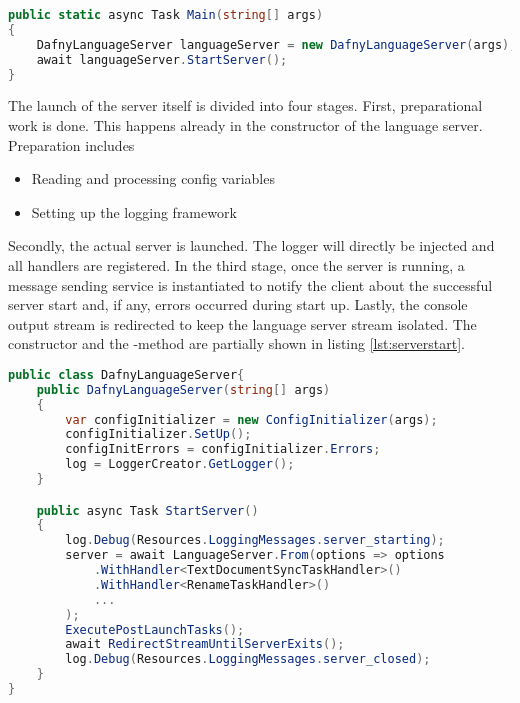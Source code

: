 \begin{lstlisting}[language=csharp, caption={Main Function}, captionpos=b, label={lst:mainserver}]
public static async Task Main(string[] args)
{
    DafnyLanguageServer languageServer = new DafnyLanguageServer(args);
    await languageServer.StartServer();
}
\end{lstlisting}

The launch of the server itself is divided into four stages.
First, preparational work is done.
This happens already in the constructor of the language server.
Preparation includes
\begin{itemize}
    \item Reading and processing config variables
    \item Setting up the logging framework
\end{itemize}
Secondly, the actual server is launched.
The logger will directly be injected and all handlers are registered.
In the third stage, once the server is running, a message sending service is instantiated to notify the client about the successful server start and, if any, errors occurred during start up.
Lastly, the console output stream is redirected to keep the language server stream isolated.
The constructor and the -method are partially shown in listing \ref{lst:serverstart}.

\begin{lstlisting}[language=csharp, caption={Starting the Language Server}, captionpos=b, label={lst:serverstart}]
public class DafnyLanguageServer{
    public DafnyLanguageServer(string[] args)
    {
        var configInitializer = new ConfigInitializer(args);
        configInitializer.SetUp();
        configInitErrors = configInitializer.Errors;
        log = LoggerCreator.GetLogger();
    }

    public async Task StartServer()
    {
        log.Debug(Resources.LoggingMessages.server_starting);
        server = await LanguageServer.From(options => options
            .WithHandler<TextDocumentSyncTaskHandler>()
            .WithHandler<RenameTaskHandler>()
            ...
        );
        ExecutePostLaunchTasks();
        await RedirectStreamUntilServerExits();
        log.Debug(Resources.LoggingMessages.server_closed);
    }
}
\end{lstlisting}


